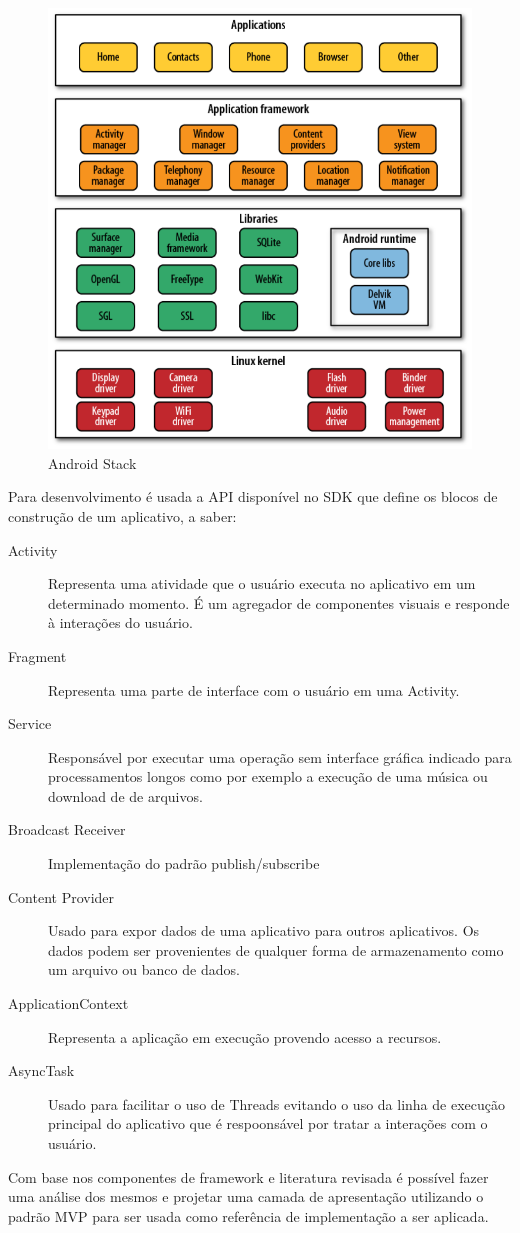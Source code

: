 \begin{figure}[htb]
	\caption{\label{android_stack} Android Stack}
	\begin{center}
		\includegraphics[scale=0.4]{img/android_stack.png}
	\end{center}
\end{figure}

Para desenvolvimento é usada a API disponível no SDK que define
os blocos de construção de um aplicativo, a saber:

\begin{description}
  \item[Activity] Representa uma atividade que o usuário executa no aplicativo
  em um determinado momento. É um agregador de componentes visuais e responde à
  interações do usuário.
  \item[Fragment] Representa uma parte de interface com o usuário em uma
  Activity.
  \item[Service] Responsável por executar uma operação sem interface gráfica
  indicado para processamentos longos como por exemplo a execução de uma música
  ou download de de arquivos.
  \item[Broadcast Receiver] Implementação do padrão publish/subscribe 
  \item[Content Provider] Usado para expor dados de uma aplicativo para outros
  aplicativos. Os dados podem ser provenientes de qualquer forma de
  armazenamento como um arquivo ou banco de dados.
  \item[ApplicationContext] Representa a aplicação em execução provendo acesso
  a recursos.
  \item[AsyncTask] Usado para facilitar o uso de Threads evitando o uso
  da linha de execução principal do aplicativo que é respoonsável por tratar a
  interações com o usuário.
\end{description}

Com base nos componentes de framework e literatura revisada é possível fazer
uma análise dos mesmos e projetar uma camada de apresentação utilizando o padrão
MVP para ser usada como referência de implementação a ser aplicada.